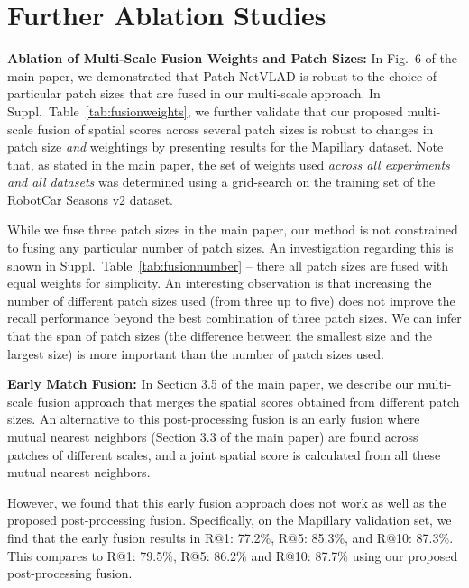 \section{Further Ablation Studies}
\label{sec:ablation}

\textbf{Ablation of Multi-Scale Fusion Weights and Patch Sizes:} 
In Fig.~6 of the main paper, we demonstrated that Patch-NetVLAD is robust to the choice of particular patch sizes that are fused in our multi-scale approach. In Suppl.~Table~\ref{tab:fusionweights}, we further validate that our proposed multi-scale fusion of spatial scores across several patch sizes is robust to changes in patch size \emph{and} weightings by presenting results for the Mapillary dataset. Note that, as stated in the main paper, the set of weights used \emph{across all experiments and all datasets} was determined using a grid-search on the training set of the RobotCar Seasons v2 dataset.

While we fuse three patch sizes in the main paper, our method is not constrained to fusing any particular number of patch sizes. An investigation regarding this is shown in Suppl.~Table~\ref{tab:fusionnumber} -- there all patch sizes are fused with equal weights for simplicity. An interesting observation is that increasing the number of different patch sizes used (from three up to five) does not improve the recall performance beyond the best combination of three patch sizes. We can infer that the span of patch sizes (the difference between the smallest size and the largest size) is more important than the number of patch sizes used.

\textbf{Early Match Fusion:}
In Section 3.5 of the main paper, we describe our multi-scale fusion approach that merges the spatial scores obtained from different patch sizes. An alternative to this post-processing fusion is an early fusion where mutual nearest neighbors (Section 3.3 of the main paper) are found across patches of different scales, and a joint spatial score is calculated from all these mutual nearest neighbors.

However, we found that this early fusion approach does not work as well as the proposed post-processing fusion. Specifically, on the Mapillary validation set, we find that the early fusion results in R@1: 77.2\%, R@5: 85.3\%, and R@10: 87.3\%. This compares to R@1: 79.5\%, R@5: 86.2\% and R@10: 87.7\% using our proposed post-processing fusion.



